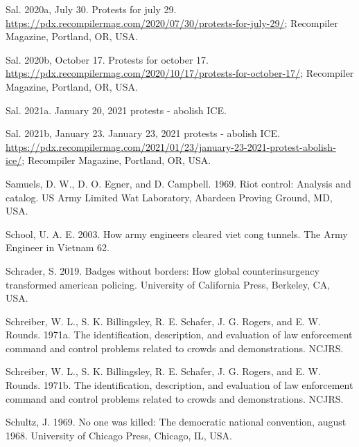 \documentclass[
  11pt,
]{krantz}
\newlength{\cslhangindent}
\newlength{\cslentryspacingunit} %
\newenvironment{CSLReferences}[2] %
 {%
  \setlength{\parindent}{0pt}
  \ifodd #1
  \let\oldpar\par
  \def\par{\hangindent=\cslhangindent\oldpar}
  \fi
  \setlength{\parskip}{#2\cslentryspacingunit}
 }%
 {}
\begin{document}
\begin{CSLReferences}{1}{0}
\leavevmode{}%
Sal. 2020a, July 30. Protests for july 29. \url{https://pdx.recompilermag.com/2020/07/30/protests-for-july-29/}; Recompiler Magazine, Portland, OR, USA.

\leavevmode{}%
Sal. 2020b, October 17. Protests for october 17. \url{https://pdx.recompilermag.com/2020/10/17/protests-for-october-17/}; Recompiler Magazine, Portland, OR, USA.

\leavevmode{}%
Sal. 2021a. January 20, 2021 protests - abolish ICE.

\leavevmode{}%
Sal. 2021b, January 23. January 23, 2021 protests - abolish ICE. \url{https://pdx.recompilermag.com/2021/01/23/january-23-2021-protest-abolish-ice/}; Recompiler Magazine, Portland, OR, USA.

\leavevmode{}%
Samuels, D. W., D. O. Egner, and D. Campbell. 1969. Riot control: Analysis and catalog. US Army Limited Wat Laboratory, Abardeen Proving Ground, MD, USA.

\leavevmode{}%
School, U. A. E. 2003. How army engineers cleared viet cong tunnels. The Army Engineer in Vietnam 62.

\leavevmode{}%
Schrader, S. 2019. Badges without borders: How global counterinsurgency transformed american policing. University of California Press, Berkeley, CA, USA.

\leavevmode{}%
Schreiber, W. L., S. K. Billingsley, R. E. Schafer, J. G. Rogers, and E. W. Rounds. 1971a. The identification, description, and evaluation of law enforcement command and control problems related to crowds and demonstrations. NCJRS.

\leavevmode{}%
Schreiber, W. L., S. K. Billingsley, R. E. Schafer, J. G. Rogers, and E. W. Rounds. 1971b. The identification, description, and evaluation of law enforcement command and control problems related to crowds and demonstrations. NCJRS.

\leavevmode{}%
Schultz, J. 1969. No one was killed: The democratic national convention, august 1968. University of Chicago Press, Chicago, IL, USA.


\end{CSLReferences}
\end{document}
